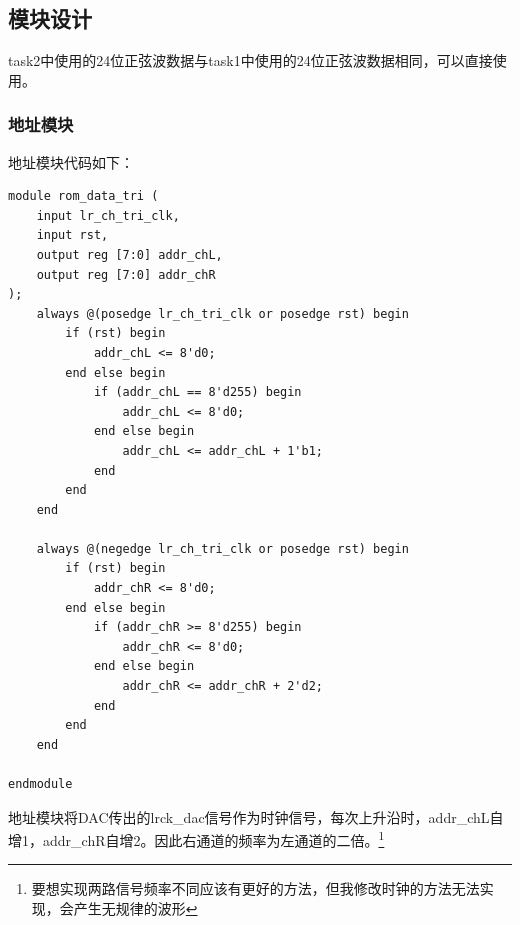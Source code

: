 \documentclass[UTF8]{ctexart}
\begin{document}
\subsection{模块设计}
task2中使用的24位正弦波数据与task1中使用的24位正弦波数据相同，可以直接使用。
\subsubsection{地址模块}
地址模块代码如下：
\begin{framed}
    \begin{lstlisting}[style=verilogStyle]
    module rom_data_tri (
    input lr_ch_tri_clk,
    input rst,
    output reg [7:0] addr_chL,
    output reg [7:0] addr_chR
);
    always @(posedge lr_ch_tri_clk or posedge rst) begin
        if (rst) begin
            addr_chL <= 8'd0;
        end else begin
            if (addr_chL == 8'd255) begin
                addr_chL <= 8'd0;
            end else begin
                addr_chL <= addr_chL + 1'b1;
            end
        end
    end

    always @(negedge lr_ch_tri_clk or posedge rst) begin
        if (rst) begin
            addr_chR <= 8'd0;
        end else begin
            if (addr_chR >= 8'd255) begin
                addr_chR <= 8'd0;
            end else begin
                addr_chR <= addr_chR + 2'd2;
            end
        end
    end

endmodule
    \end{lstlisting}
\end{framed}
地址模块将DAC传出的lrck\_dac信号作为时钟信号，每次上升沿时，addr\_chL自增1，addr\_chR自增2。因此右通道的频率为左通道的二倍。\footnote{要想实现两路信号频率不同应该有更好的方法，但我修改时钟的方法无法实现，会产生无规律的波形}
\end{document}
